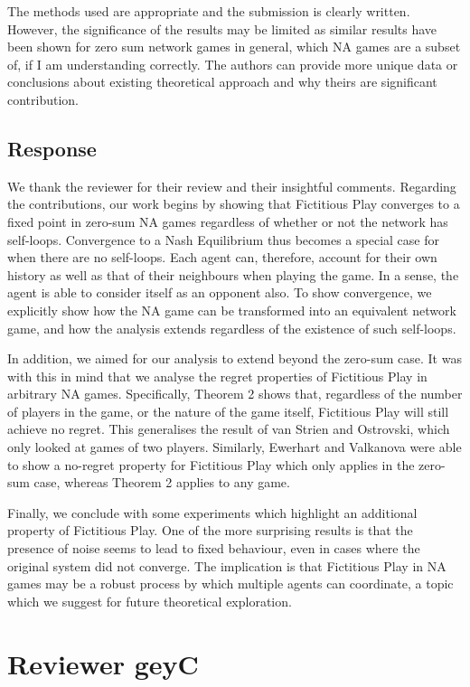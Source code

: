\documentclass{article}
\begin{document}
	The methods used are appropriate and the submission is clearly written. However, the significance of the results may be limited as similar results have been shown for zero sum network games in general, which NA games are a subset of, if I am understanding correctly. The authors can provide more unique data or conclusions about existing theoretical approach and why theirs are significant contribution.
	
	\subsection{Response}
	
	We thank the reviewer for their review and their insightful comments. Regarding the contributions, our work begins by showing that Fictitious Play converges to a fixed point in zero-sum NA games regardless of whether or not the network has self-loops. Convergence to a Nash Equilibrium thus becomes a special case for when there are no self-loops. Each agent can, therefore, account for their own history as well as that of their neighbours when playing the game. In a sense, the agent is able to consider itself as an opponent also. To show convergence, we explicitly show how the NA game can be transformed into an equivalent network game, and how the analysis extends regardless of the existence of such self-loops. 
	
	In addition, we aimed for our analysis to extend beyond the zero-sum case. It was with this in mind that we analyse the regret properties of Fictitious Play in arbitrary NA games. Specifically, Theorem 2 shows that, regardless of the number of players in the game, or the nature of the game itself, Fictitious Play will still achieve no regret. This generalises the result of van Strien and Ostrovski, which only looked at games of two players. Similarly, Ewerhart and Valkanova were able to show a no-regret property for Fictitious Play which only applies in the zero-sum case, whereas Theorem 2 applies to any game.
	
	Finally, we conclude with some experiments which highlight an additional property of Fictitious Play. One of the more surprising results is that the presence of noise seems to lead to fixed behaviour, even in cases where the original system did not converge. The implication is that Fictitious Play in NA games may be a robust process by which multiple agents can coordinate, a topic which we suggest for future theoretical exploration.
	
	\section{Reviewer geyC}
	
\end{document}
